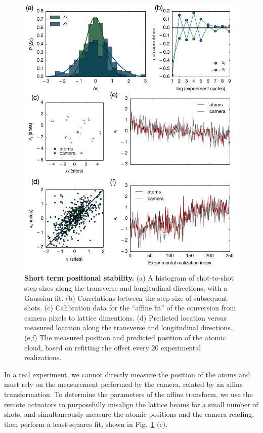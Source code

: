 \documentclass[twocolumn,aps,pra,showpacs,preprintnumbers,bibnotes]{revtex4-1}
\begin{document}
\begin{figure}
  \begin{center}
    \includegraphics{Figure13.pdf}
    \caption{\textbf{Short term positional stability.} (a) A histogram of shot-to-shot step sizes along the transverse and longitudinal directions, with a Gaussian fit. (b) Correlations between the step size of subsequent shots. (c) Calibration data for the ``affine fit'' of the conversion from camera pixels to lattice dimentions. (d) Predicted location versus measured location along the transverse and longitudinal directions. (e,f) The measured position and predicted position of the atomic cloud, based on refitting the offset every $20$ experimental realizations.}\label{fig:stability}
  \end{center}
\end{figure}

In a real experiment, we cannot directly measure the position of the atoms and must rely on the measurement performed by the camera, related by an affine transformation.
To determine the parameters of the affine transform, we use the remote actuators to purposefully misalign the lattice beams for a small number of shots, and simultaneously measure the atomic positions and the camera reading, then perform a least-squares fit, shown in Fig.~\ref{fig:stability} (c).
\end{document}
